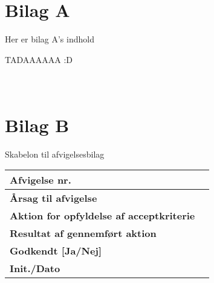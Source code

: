 \newpage
\appendix
\section{\\Bilag A} \label{App:BilagA}

Her er bilag A's indhold 


TADAAAAAA :D 

\newpage
\section{\\Bilag B} \label{App:BilagB}

Skabelon til afvigelsesbilag 

\begin{tabularx}{1\textwidth}{|l|X|}
\hline
\textbf{Afvigelse nr.}              &   \\ \hline
\textbf{Årsag til afvigelse}        &   \\ \hline
\textbf{Aktion for opfyldelse af acceptkriterie}            & \\ \hline
\textbf{Resultat af gennemført aktion}           &  \\ \hline
\textbf{Godkendt {[}Ja/Nej{]}} &  \\ \hline
\textbf{Init./Dato}            &  \\ \hline
\end{tabularx}
